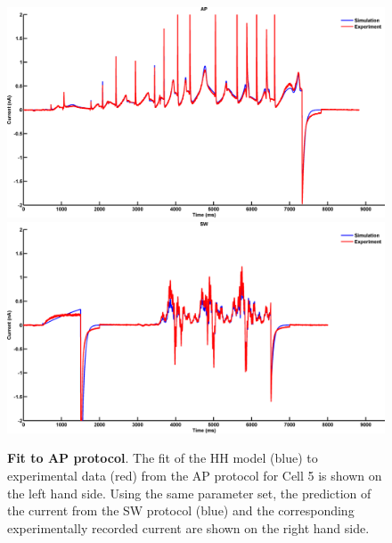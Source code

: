 \documentclass[11pt,a4paper,oneside]{article}
\begin{document}
\begin{figure}[ht]
\begin{center}
\includegraphics[scale=0.42]{Figures/Fig_hh_16713110_FP_ap_CP_ap.png}
\includegraphics[scale=0.42]{Figures/Fig_hh_16713110_FP_ap_CP_sine_wave.png}
\caption{\textbf{Fit to AP protocol}. The fit of the HH model (blue) to experimental data (red) from the AP protocol  for Cell 5 is shown on the left hand side. Using the same parameter set, the prediction of the current from the SW protocol (blue) and the corresponding experimentally recorded current are shown on the right hand side.} 
\label{Fig_APfit}
\end{center}
\end{figure}
\end{document}

